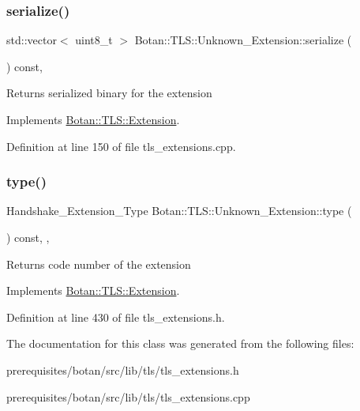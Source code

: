 \subsubsection{\texorpdfstring{serialize()}{serialize()}}
{\footnotesize\ttfamily std\+::vector$<$ uint8\+\_\+t $>$ Botan\+::\+T\+L\+S\+::\+Unknown\+\_\+\+Extension\+::serialize (\begin{DoxyParamCaption}{ }\end{DoxyParamCaption}) const\hspace{0.3cm}{\ttfamily [override]}, {\ttfamily [virtual]}}

\begin{DoxyReturn}{Returns}
serialized binary for the extension 
\end{DoxyReturn}


Implements \mbox{\hyperlink{class_botan_1_1_t_l_s_1_1_extension_a56788726ad2526db54e5a26039cb69db}{Botan\+::\+T\+L\+S\+::\+Extension}}.



Definition at line 150 of file tls\+\_\+extensions.\+cpp.

\mbox{\label{class_botan_1_1_t_l_s_1_1_unknown___extension_a3662bce2ca66c928000baba33369623d}} 
\subsubsection{\texorpdfstring{type()}{type()}}
{\footnotesize\ttfamily Handshake\+\_\+\+Extension\+\_\+\+Type Botan\+::\+T\+L\+S\+::\+Unknown\+\_\+\+Extension\+::type (\begin{DoxyParamCaption}{ }\end{DoxyParamCaption}) const\hspace{0.3cm}{\ttfamily [inline]}, {\ttfamily [override]}, {\ttfamily [virtual]}}

\begin{DoxyReturn}{Returns}
code number of the extension 
\end{DoxyReturn}


Implements \mbox{\hyperlink{class_botan_1_1_t_l_s_1_1_extension_ac8819b312ce604453225e7b4f7c373ec}{Botan\+::\+T\+L\+S\+::\+Extension}}.



Definition at line 430 of file tls\+\_\+extensions.\+h.



The documentation for this class was generated from the following files\+:\begin{DoxyCompactItemize}
\item 
prerequisites/botan/src/lib/tls/tls\+\_\+extensions.\+h\item 
prerequisites/botan/src/lib/tls/tls\+\_\+extensions.\+cpp\end{DoxyCompactItemize}
